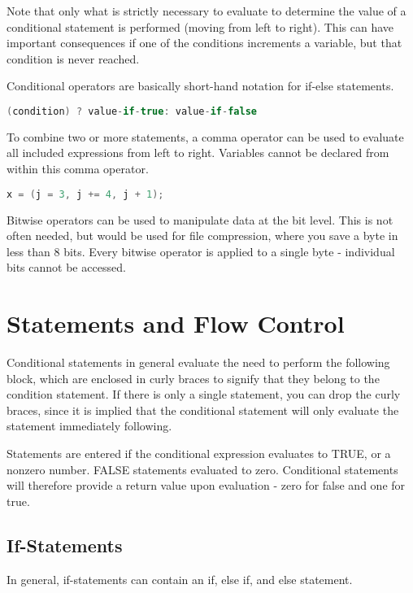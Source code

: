 \documentclass[10pt]{article}
\begin{document}
Note that only what is strictly necessary to evaluate to determine the value of a conditional statement is performed (moving from left to right). This can have important consequences if one of the conditions increments a variable, but that condition is never reached. 

Conditional operators are basically short-hand notation for if-else statements.

\begin{lstlisting}[language=C++]
(condition) ? value-if-true: value-if-false
\end{lstlisting}

To combine two or more statements, a comma operator can be used to evaluate all included expressions from left to right. Variables cannot be declared from within this comma operator.

\begin{lstlisting}[language=C++]
x = (j = 3, j += 4, j + 1);
\end{lstlisting}

Bitwise operators can be used to manipulate data at the bit level. This is not often needed, but would be used for file compression, where you save a byte in less than 8 bits. Every bitwise operator is applied to a single byte - individual bits cannot be accessed. 

\section{Statements and Flow Control}

Conditional statements in general evaluate the need to perform the following block, which are enclosed in curly braces to signify that they belong to the condition statement. If there is only a single statement, you can drop the curly braces, since it is implied that the conditional statement will only evaluate the statement immediately following.

Statements are entered if the conditional expression evaluates to TRUE, or a nonzero number. FALSE statements evaluated to zero. Conditional statements will therefore provide a return value upon evaluation - zero for false and one for true. 

\subsection{If-Statements}

In general, if-statements can contain an if, else if, and else statement. 
\end{document}
